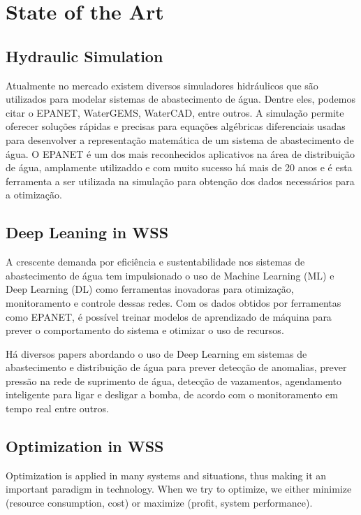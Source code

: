 \chapter{State of the Art}%
\label{chapter:state-of-the-art}



\section{Hydraulic Simulation}

Atualmente no mercado existem diversos simuladores hidráulicos que são utilizados para modelar sistemas de abastecimento de água. Dentre eles, podemos citar o EPANET, WaterGEMS, WaterCAD, entre outros. A simulação permite oferecer soluções rápidas e precisas para equações algébricas diferenciais usadas para desenvolver a representação matemática de um sistema de abastecimento de água\cite{rfc1}. O EPANET é um dos mais reconhecidos aplicativos na área de distribuição de água\cite{rfc4}, amplamente utilizaddo e com muito sucesso\cite{rfc5} há mais de 20 anos\cite{rfc6} e é esta ferramenta a ser utilizada na simulação para obtenção dos dados necessários para a otimização.


\section{Deep Leaning in WSS}

A crescente demanda por eficiência e sustentabilidade nos sistemas de abastecimento de água tem impulsionado o uso de Machine Learning (ML) e Deep Learning (DL) como ferramentas inovadoras para otimização, monitoramento e controle dessas redes. Com os dados obtidos por ferramentas como EPANET, é possível treinar modelos de aprendizado de máquina para prever o comportamento do sistema e otimizar o uso de recursos.

Há diversos papers abordando o uso de Deep Learning em sistemas de abastecimento e distribuição de água para prever detecção de anomalias\cite{rfc12}, prever pressão na rede de suprimento de água\cite{rfc11}, detecção de vazamentos\cite{rfc13}, agendamento inteligente para ligar e desligar a bomba, de acordo com o monitoramento em tempo real\cite{rfc9} entre outros.


\section{Optimization in WSS}

Optimization is applied in many systems and situations, thus making it an important paradigm
in technology. When we try to optimize, we either minimize (resource consumption, cost) or
maximize (profit, system performance)\cite{rfc19}.

